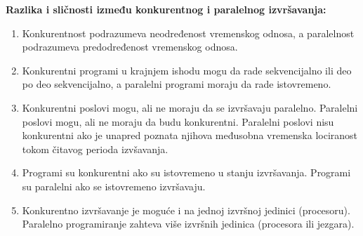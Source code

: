 \documentclass[a4paper]{article}
\begin{document}
  \noindent \textbf{Razlika i sličnosti između konkurentnog i paralelnog izvršavanja:}
  \begin{enumerate}
    \item Konkurentnost podrazumeva neodređenost vremenskog odnosa, a paralelnost podrazumeva
          predodređenost vremenskog odnosa.
    \item Konkurentni programi u krajnjem ishodu mogu da rade sekvencijalno ili deo po deo
          sekvencijalno, a paralelni programi moraju da rade istovremeno.
    \item Konkurentni poslovi mogu, ali ne moraju da se izvršavaju paralelno. Paralelni poslovi
          mogu, ali ne moraju da budu konkurentni. Paralelni poslovi nisu konkurentni ako je unapred
          poznata njihova međusobna vremenska lociranost tokom čitavog perioda izvšavanja.
    \item Programi su konkurentni ako su istovremeno u stanju izvršavanja. Programi su paralelni
          ako se istovremeno izvršavaju. 
    \item Konkurentno izvršavanje je moguće i na jednoj izvršnoj jedinici (procesoru). 
          Paralelno programiranje zahteva više izvršnih jedinica (procesora ili jezgara).
  \end{enumerate}
\end{document}
